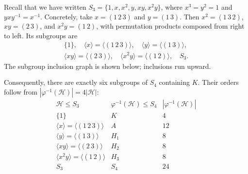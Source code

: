 \documentclass[reqno,11pt]{amsart}
\begin{document}
Recall that we have written $S_3=\{1,x,x^2,y,xy,x^2y\}$, where $x^3=y^2=1$ and
$yxy^{-1}=x^{-1}$. Concretely, take $x=(1\,2\,3)$ and $y=(1\,3)$. Then
$x^2=(1\,3\,2)$, $xy=(2\,3)$, and $x^2y=(1\,2)$, with permutation
products composed from right to left. Its subgroups are
\[
\begin{gathered}
  \{1\},\quad \langle x\rangle=\langle(1\,2\,3)\rangle,\quad
  \langle y\rangle=\langle(1\,3)\rangle,\\
  \langle xy\rangle=\langle(2\,3)\rangle,\quad
  \langle x^2y\rangle=\langle(1\,2)\rangle,\quad S_3.
\end{gathered}
\]
The subgroup inclusion graph is
shown below; inclusions run upward.
\begin{center}
\end{center}

Consequently, there are exactly six subgroups of $S_4$ containing $K$.
Their orders follow from $|\varphi^{-1}(\mathcal H)|=4|\mathcal H|$:
\[
\begin{array}{c|c|c}
  \mathcal H\leq S_3 & \varphi^{-1}(\mathcal H)\leq S_4
    & |\varphi^{-1}(\mathcal H)|\\ \hline
  \{1\} & K & 4\\
  \langle x\rangle=\langle(1\,2\,3)\rangle & A & 12\\
  \langle y\rangle=\langle(1\,3)\rangle & H_1 & 8\\
  \langle xy\rangle=\langle(2\,3)\rangle & H_2 & 8\\
  \langle x^2y\rangle=\langle(1\,2)\rangle & H_3 & 8\\
  S_3 & S_4 & 24
\end{array}
\]
\end{document}
